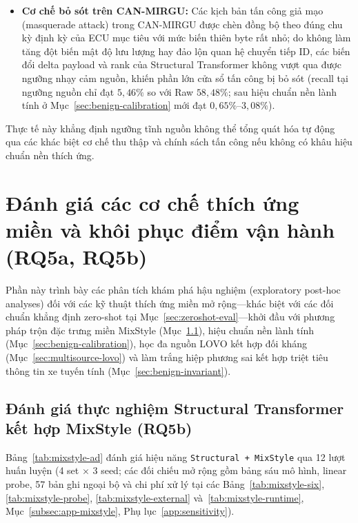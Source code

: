 \documentclass[12pt, a4paper, reqno, oneside]{book}
\DeclareRobustCommand{\code}[1]{\nolinkurl{#1}}
\begin{document}
\begin{itemize}
\begin{enumerate}
    \end{enumerate}
    \item \textbf{Cơ chế bỏ sót trên CAN-MIRGU:} Các kịch bản tấn công giả mạo (masquerade attack) trong CAN-MIRGU được chèn đồng bộ theo đúng chu kỳ định kỳ của ECU mục tiêu với mức biến thiên byte rất nhỏ; do không làm tăng đột biến mật độ lưu lượng hay đảo lộn quan hệ chuyển tiếp ID, các biến đổi delta payload và rank của Structural Transformer không vượt qua được ngưỡng nhạy cảm nguồn, khiến phần lớn cửa sổ tấn công bị bỏ sót (recall tại ngưỡng nguồn chỉ đạt $5{,}46\%$ so với Raw $58{,}48\%$; sau hiệu chuẩn nền lành tính ở Mục~\ref{sec:benign-calibration} mới đạt $0{,}65\%\text{--}3{,}08\%$).
\end{itemize}
Thực tế này khẳng định ngưỡng tĩnh nguồn không thể tổng quát hóa tự động qua các khác biệt cơ chế thu thập và chính sách tấn công nếu không có khâu hiệu chuẩn nền thích ứng.

\section{Đánh giá các cơ chế thích ứng miền và khôi phục điểm vận hành (RQ5a, RQ5b)}\label{sec:adaptation-eval}
Phần này trình bày các phân tích khám phá hậu nghiệm (exploratory post-hoc analyses) đối với các kỹ thuật thích ứng miền mở rộng---khác biệt với các đối chuẩn khẳng định zero-shot tại Mục~\ref{sec:zeroshot-eval}---khởi đầu với phương pháp trộn đặc trưng miền MixStyle (Mục~\ref{sec:mixstyle-study}), hiệu chuẩn nền lành tính (Mục~\ref{sec:benign-calibration}), học đa nguồn LOVO kết hợp đối kháng (Mục~\ref{sec:multisource-lovo}) và làm trắng hiệp phương sai kết hợp triệt tiêu thông tin xe tuyến tính (Mục~\ref{sec:benign-invariant}).

\subsection{Đánh giá thực nghiệm Structural Transformer kết hợp MixStyle (RQ5b)}\label{sec:mixstyle-study}
Bảng~\ref{tab:mixstyle-ad} đánh giá hiệu năng \code{Structural + MixStyle} qua 12 lượt huấn luyện (4 set $\times$ 3 seed; các đối chiếu mở rộng gồm bảng sáu mô hình, linear probe, 57 bản ghi ngoại bộ và chi phí xử lý tại các Bảng~\ref{tab:mixstyle-six}, \ref{tab:mixstyle-probe}, \ref{tab:mixstyle-external} và~\ref{tab:mixstyle-runtime}, Mục~\ref{subsec:app-mixstyle}, Phụ lục~\ref{app:sensitivity}).
\end{document}
